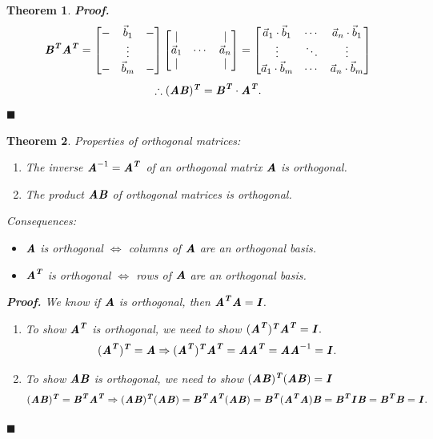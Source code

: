 \documentclass[12pt, a4paper]{article}
\newtheorem{thm}{Theorem}[subsection]
\newenvironment*{prf}{\indent\textbf{\textit{Proof. }}}{\hfill $\blacksquare$\par}
\def\T{{\textbf{\emph{T}}}}
\def\veca{\vec{a}}
\def\vecb{\vec{b}}
\def\matrixA{\textbf{\emph{A}}}
\def\matrixB{\textbf{\emph{B}}}
\def\matrixI{\textbf{\emph{I}}}
\begin{document}
\begin{thm}
\begin{prf}
		\[\matrixB^\T\matrixA^\T=\begin{bmatrix}-&\vecb_1&-\\&\vdots&\\-&\vecb_m&-\end{bmatrix}\begin{bmatrix}|&&|\\\veca_1&\cdots&\veca_n\\|&&|\end{bmatrix}=\begin{bmatrix}\veca_1\cdot\vecb_1&\cdots&\veca_n\cdot\vecb_1\\\vdots&\ddots&\vdots\\\veca_1\cdot\vecb_m&\cdots&\veca_n\cdot\vecb_m\end{bmatrix}\]
		\[\therefore(\matrixA\matrixB)^\T=\matrixB^\T\cdot\matrixA^\T.\]
	\end{prf}
\end{thm}
\begin{thm}
	Properties of orthogonal matrices:
	\begin{enumerate}
		\item The inverse $\matrixA^{-1}=\matrixA^\T$ of an orthogonal matrix $\matrixA$ is orthogonal. 
		\item The product $\matrixA\matrixB$ of orthogonal matrices is orthogonal. 	
	\end{enumerate}
	Consequences: 
	\begin{itemize}
		\item $\matrixA$ is orthogonal $\Longleftrightarrow$ columns of $\matrixA$ are an orthogonal basis.
		\item $\matrixA^\T$ is orthogonal $\Longleftrightarrow$ rows of $\matrixA$ are an orthogonal basis. 
	\end{itemize}
	\begin{prf}
		We know if $\matrixA$ is orthogonal, then $\matrixA^\T\matrixA=\matrixI.$
		\begin{enumerate}
			\item To show $\matrixA^\T$ is orthogonal, we need to show $(\matrixA^\T)^\T\matrixA^\T=\matrixI.$ \[(\matrixA^\T)^\T=\matrixA\Rightarrow(\matrixA^\T)^\T\matrixA^\T=\matrixA\matrixA^\T=\matrixA\matrixA^{-1}=\matrixI.\]
			\item To show $\matrixA\matrixB$ is orthogonal, we need to show $(\matrixA\matrixB)^\T(\matrixA\matrixB)=\matrixI$ \[(\matrixA\matrixB)^\T=\matrixB^\T\matrixA^\T\Rightarrow(\matrixA\matrixB)^\T(\matrixA\matrixB)=\matrixB^\T\matrixA^\T(\matrixA\matrixB)=\matrixB^\T(\matrixA^\T\matrixA)\matrixB=\matrixB^\T\matrixI\matrixB=\matrixB^\T\matrixB=\matrixI.\]
		\end{enumerate}
	\end{prf}
\end{thm}
\end{document}

